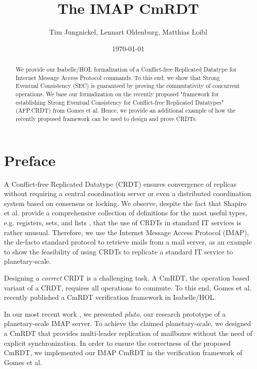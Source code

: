 \documentclass[11pt,a4paper, DIV=11]{article}
\begin{document}
\title{The IMAP CmRDT}
\author{Tim Jungnickel, Lennart Oldenburg, Matthias Loibl}
\date{\today}
\maketitle

\begin{abstract}
We provide our Isabelle/HOL formalization of a Conflict-free Replicated Datatype
for Internet Message Access Protocol commands. To this end, we show that Strong Eventual Consistency (SEC)
is guaranteed by proving the commutativity of concurrent operations. We base
our formalization on the recently proposed "framework for establishing Strong Eventual Consistency for Conflict-free Replicated Datatypes" (AFP.CRDT)
from Gomes et al{.} Hence, we provide an additional example of how the recently
proposed framework can be used to design and prove CRDTs.
\end{abstract}

\tableofcontents

\section{Preface}

A Conflict-free Replicated Datatype (CRDT) \cite{shapiro_crdt} ensures
convergence of replicas without requiring a central coordination server or even
a distributed coordination system based on consensus or locking.
We observe, despite the fact that Shapiro et al{.} provide a comprehensive
collection of definitions for the most useful types, e.g. registers, sets, and
lists \cite{shapiro_report}, that the use of CRDTs in standard IT services is rather unusual.
Therefore, we use the Internet Message Access Protocol (IMAP), the de-facto
standard protocol to retrieve mails from a mail server, as an example to show
the feasibility of using CRDTs to replicate a standard IT service to
planetary-scale.

Designing a \emph{correct} CRDT is a challenging task.
A CmRDT, the operation based variant of a CRDT, requires all operations to
commute.
To this end, Gomes et al{.} recently published a CmRDT verification
framework \cite{gomes_crdtafp} in Isabelle/HOL.

In our most recent work \cite{pluto}, we presented \emph{pluto}, our research
prototype of a planetary-scale IMAP server.
To achieve the claimed planetary-scale, we designed a CmRDT that provides
multi-leader replication of mailboxes without the need of explicit
synchronization. In order to ensure the correctness of the proposed CmRDT, we
implemented our IMAP CmRDT in the verification framework of Gomes et al{.}
\end{document}
